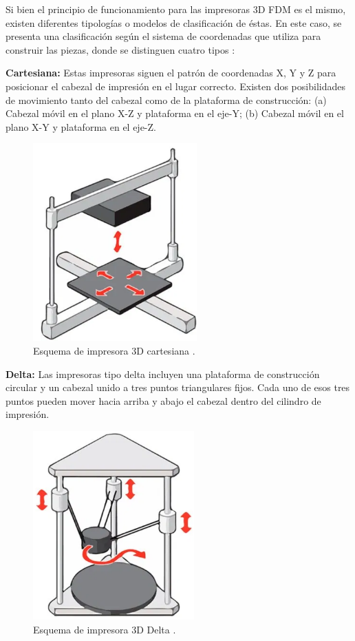Si bien el principio de funcionamiento para las impresoras 3D FDM es el mismo, existen diferentes tipologías o modelos de clasificación de éstas. En este caso, se presenta una clasificación según el sistema de coordenadas que utiliza para construir las piezas, donde se distinguen cuatro tipos \citep{b3dsourced2020}:

\begin{description}
\item \textbf{Cartesiana:} Estas impresoras siguen el patrón de coordenadas X, Y y Z para posicionar el cabezal de impresión en el lugar correcto. Existen dos posibilidades de movimiento tanto del cabezal como de la plataforma de construcción: (a) Cabezal móvil en el plano X-Z y plataforma en el eje-Y; (b) Cabezal móvil en el plano X-Y y plataforma en el eje-Z.

\begin{figure}[H]
\centering
\includegraphics[scale=0.6]{images/cartesiana.png}
\caption{Esquema de impresora 3D cartesiana \citep{b3dsourced2020}.}
\end{figure}

\item \textbf{Delta:} Las impresoras tipo delta incluyen una plataforma de construcción circular y un cabezal unido a tres puntos triangulares fijos. Cada uno de esos tres puntos pueden mover hacia arriba y abajo el cabezal dentro del cilindro de impresión.

\begin{figure}[H]
\centering
\includegraphics[scale=0.6]{images/delta.png}
\caption{Esquema de impresora 3D Delta \citep{b3dsourced2020}.}
\end{figure}


\end{description}

